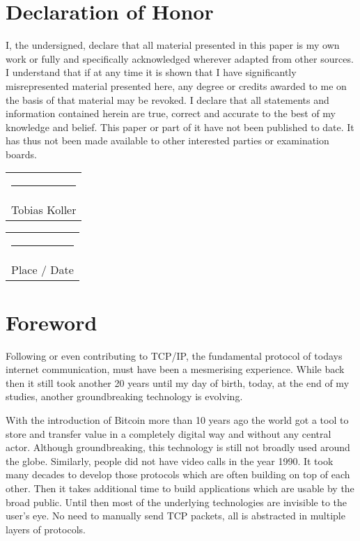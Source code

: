 \documentclass[final]{fhnwreport}       %
\begin{document}
\section*{Declaration of Honor}

I, the undersigned, declare that all material presented in this paper is my own work or fully and specifically acknowledged wherever adapted from other sources. I understand that if at any time it is shown that I have significantly misrepresented material presented here, any degree or credits awarded to me on the basis of that material may be revoked. I declare that all statements and information contained herein are true, correct and accurate to the best of my knowledge and belief. This  paper or part of it have not been published to date. It has thus not been made available to other interested parties or examination boards.  

\vspace*{4em}\noindent
\hfill%
\begin{tabular}[t]{c}
  \rule{10em}{0.4pt}\\Tobias Koller 
\end{tabular}%
\hfill%
\begin{tabular}[t]{c}
  \rule{10em}{0.4pt}\\ Place / Date
\end{tabular}%
\hfill\strut
\clearpage

\section*{Foreword}

Following or even contributing to TCP/IP, the fundamental protocol of todays internet communication, must have been a mesmerising experience. While back then it still took another 20 years until my day of birth, today, at the end of my studies, another groundbreaking technology is evolving. 

With the introduction of Bitcoin more than 10 years ago the world got a tool to store and transfer value in a completely digital way and without any central actor. Although groundbreaking, this technology is still not broadly used around the globe. Similarly, people did not have video calls in the year 1990. It took many decades to develop those protocols which are often building on top of each other. Then it takes additional time to build applications which are usable by the broad public.  Until then most of the underlying technologies are invisible to the user's eye. No need to manually send TCP packets, all is abstracted in multiple layers of protocols.
\end{document}
